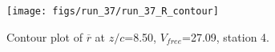 \begin{figure}[H]
\centering
\texttt{[image: figs/run\_37/run\_37\_R\_contour]}
\caption{Contour plot of $\overline{r}$ at $z/c$=8.50, $V_{free}$=27.09, station 4.}
\label{fig:run_37_R_contour}
\end{figure}


